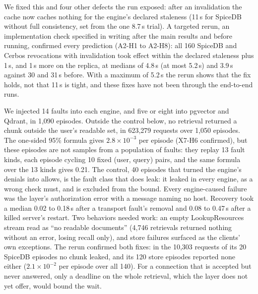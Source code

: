 We fixed this and four other defects the run exposed: after an invalidation the cache now caches nothing for the
engine's declared staleness (11\,s for SpiceDB without full consistency, set from the one 8.7\,s trial). A targeted rerun, an implementation check
specified in writing after the main results and before running, confirmed every prediction (A2-H1 to A2-H8): all 160
SpiceDB and Cerbos revocations with invalidation took effect within the declared staleness plus 1\,s, and 1\,s more on
the replica, at medians of 4.8\,s (at most 5.2\,s) and 3.9\,s against 30 and 31\,s before. With a maximum of 5.2\,s the rerun shows
that the fix holds, not that 11\,s is tight, and these fixes have not been through the end-to-end runs.

We injected 14 faults into each engine, and five or eight into pgvector and Qdrant, in 1,090 episodes. Outside
the control below, no retrieval returned a chunk outside the user's readable set, in 623,279 requests over 1,050
episodes. The one-sided 95\% formula gives $2.8 \times 10^{-3}$ per episode (X7-H6 confirmed), but these episodes are not samples from a
population of faults: they replay 13 fault kinds, each episode cycling 10 fixed (user, query) pairs, and the same formula over the 13 kinds gives 0.21.
The control, 40 episodes that turned the engine's denials into allows, is the fault class that does leak: it leaked in every engine, as a wrong check must, and is
excluded from the bound. Every engine-caused
failure was the layer's authorization error with a message naming no host. Recovery took a median 0.02 to
0.18\,s after a transport fault's removal and 0.08 to 0.47\,s after a killed server's restart. Two behaviors needed work: an empty LookupResources stream read as ``no
readable documents'' (4,746 retrievals returned nothing without an error, losing recall only), and store failures
surfaced as the clients' own exceptions. The rerun confirmed both fixes: in the 10,303 requests of its 20 SpiceDB episodes
no chunk leaked, and its 120 store episodes reported none either ($2.1 \times 10^{-2}$ per episode over all 140). For a connection that is accepted but never answered, only a
deadline on the whole retrieval, which the layer does not yet offer, would bound the wait.
